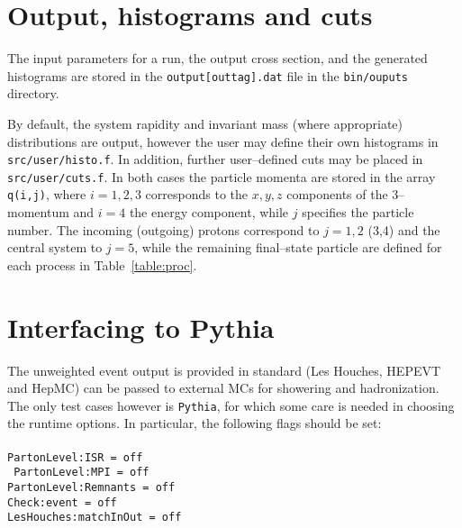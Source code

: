 \documentclass[12pt]{article}
\begin{document}
\section{Output, histograms and cuts}\label{sec:hist}

The input parameters for a run, the output cross section, and the generated histograms are stored in the \texttt{output[outtag].dat} file in the \texttt{bin/ouputs} directory. 

By default, the system rapidity and invariant mass (where appropriate) distributions are output, however the user may define their own histograms in \texttt{src/user/histo.f}. In addition, further user--defined cuts may be placed in \texttt{src/user/cuts.f}. In both cases the particle momenta are stored in the array \texttt{q(i,j)}, where $i=1,2,3$ corresponds to the $x,y,z$ components of the 3--momentum and $i=4$ the energy component, while $j$ specifies the particle number. The incoming (outgoing) protons correspond to $j=1,2$ (3,4) and the central system to $j=5$, while the remaining final--state particle are defined for each process in Table~\ref{table:proc}.

\section{Interfacing to Pythia}

The unweighted event output is provided in standard (Les Houches, HEPEVT and HepMC) can be passed to external MCs for showering and hadronization. The only test cases however is \texttt{Pythia}, for which some care is needed in choosing the runtime options. In particular, the following flags should be set:
\\
\\
 \texttt{PartonLevel:ISR = off}\\
 \texttt{ PartonLevel:MPI = off}\\
 \texttt{PartonLevel:Remnants = off}\\
 \texttt{Check:event = off}\\
 \texttt{LesHouches:matchInOut = off}\\
 
\end{document}
